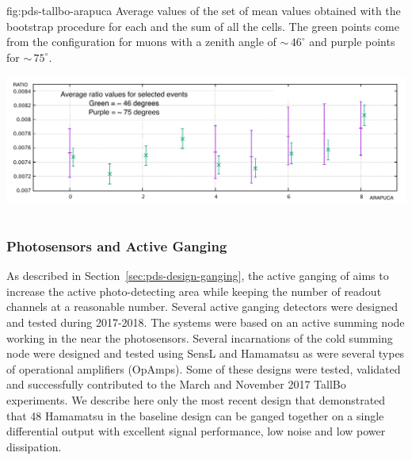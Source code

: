 \begin{dunefigure}
 {fig:pds-tallbo-arapuca}
 {Average values of the set of mean values obtained with the bootstrap procedure for each 
 and the sum of all the cells. The green points come from the configuration for muons with a zenith angle of $\sim\,46^{\circ}$ and purple points for $\sim\,75^{\circ}$.}
\includegraphics[angle=0,height=5cm]{graphics/pds-arapuca_ratio.pdf}
\end{dunefigure}


\subsubsection{Photosensors and Active Ganging}
\label{sec:pds-valid-ganging}

As described in Section~\ref{sec:pds-design-ganging}, the active ganging of   aims to increase the active photo-detecting area while keeping the number of readout channels at a reasonable number. 
Several active ganging detectors were designed and tested during 2017-2018. 
The systems were based on an active summing node working in the \lar near the photosensors. Several incarnations of the cold summing node were designed and tested using SensL and Hamamatsu  %
as were several types of operational amplifiers (OpAmps). 
Some of these designs were tested, validated and successfully contributed to the March and November 2017 TallBo experiments.  
We describe here only the most recent design that demonstrated that 48 Hamamatsu  in the baseline design can be ganged together on a single differential output with excellent signal performance, low noise and low power dissipation.

